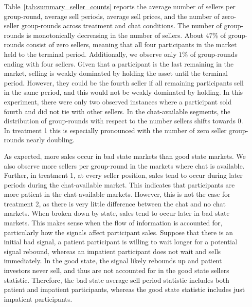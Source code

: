 \documentclass[11pt]{article}
\begin{document}
Table~\ref{tab:summary_seller_counts} reports the average number of sellers per group-round, average sell periods, average sell prices, and the number of zero-seller group-rounds across treatment and chat conditions. The number of group-rounds is monotonically decreasing in the number of sellers. About $47\%$ of group-rounds consist of zero sellers, meaning that all four participants in the market held to the terminal period. Additionally, we observe only $1\%$ of group-rounds ending with four sellers. Given that a participant is the last remaining in the market, selling is weakly dominated by holding the asset until the terminal period. However, they could be the fourth seller if all remaining participants sell in the same period, and this would not be weakly dominated by holding. In this experiment, there were only two observed instances where a participant sold fourth and did not tie with other sellers. In the chat-available segments, the distribution of group-rounds with respect to the number sellers shifts towards 0. In treatment 1 this is especially pronounced with the number of zero seller group-rounds nearly doubling.

As expected, more sales occur in bad state markets than good state markets. We also observe more sellers per group-round in the markets where chat is available. Further, in treatment 1, at every seller position, sales tend to occur during later periods during the chat-available market. This indicates that participants are more patient in the chat-available markets. However, this is not the case for treatment 2, as there is very little difference between the chat and no chat markets. When broken down by state, sales tend to occur later in bad state markets. This makes sense when the flow of information is accounted for, particularly how the signals affect participant sales. Suppose that there is an initial bad signal, a patient participant is willing to wait longer for a potential signal rebound, whereas an impatient participant does not wait and sells immediately. In the good state, the signal likely rebounds up and patient investors never sell, and thus are not accounted for in the good state sellers statistic. Therefore, the bad state average sell period statistic includes both patient and impatient participants, whereas the good state statistic includes just impatient participants.

\begin{table}[H]
  \centering
  \caption{Subject pool demographics and personality traits}
  \label{tab:summary_demographics_traits}
  
\end{table}
\end{document}
